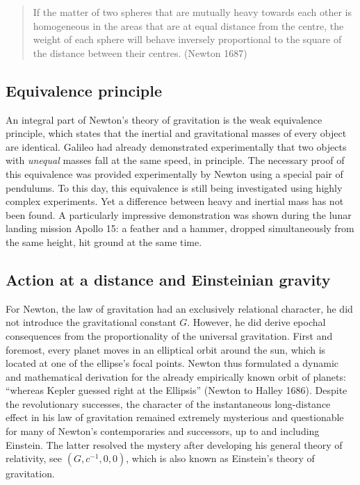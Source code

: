 \begin{quote}
  If the matter of two spheres that are mutually heavy towards each other is homogeneous in the areas that are at equal distance from the centre, the weight of each sphere will behave inversely proportional to the square of the distance between their centres. (Newton 1687)
\end{quote}


\subsection*{Equivalence principle}

An integral part of Newton's theory of gravitation is the weak equivalence principle, which states that the inertial and gravitational masses of every object are identical. Galileo had already demonstrated experimentally that two objects with \emph{unequal} masses fall at the same speed, in principle. The necessary proof of this equivalence was provided experimentally by Newton using a special pair of pendulums. To this day, this equivalence is still being investigated using highly complex experiments. Yet a difference between heavy and inertial mass has not been found. A particularly impressive demonstration was shown during the lunar landing mission Apollo 15: a feather and a hammer, dropped simultaneously from the same height, hit ground at the same time.


\subsection*{Action at a distance and Einsteinian gravity}

For Newton, the law of gravitation had an exclusively relational character, he did not introduce the gravitational constant $G$. However, he did derive epochal consequences from the proportionality of the universal gravitation. First and foremost, every planet moves in an elliptical orbit around the sun, which is located at one of the ellipse's focal points. Newton thus formulated a dynamic and mathematical derivation for the already empirically known orbit of planets: \enquote{whereas Kepler guessed right at the Ellipsis} (Newton to Halley 1686). Despite the revolutionary successes, the character of the instantaneous long-distance effect in his law of gravitation remained extremely mysterious and questionable for many of Newton's contemporaries and successors, up to and including Einstein. The latter resolved the mystery after developing his general theory of relativity, see $(G,c^{-1},0,0)$, which is also known as Einstein's theory of gravitation.
